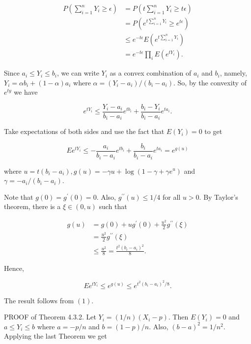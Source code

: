 \documentclass[13pt]{article}
\theoremstyle{definition}
\theoremstyle{remark}
\begin{document}
$$
\begin{aligned}
P\left(\sum_{i=1}^{n} Y_{i} \geq \epsilon\right) & =P\left(t \sum_{i=1}^{n} Y_{i} \geq t \epsilon\right) \\
& =P\left(e^{t \sum_{i=1}^{n} Y_{i}} \geq e^{t \epsilon}\right) \\
& \leq e^{-t \epsilon} E\left(e^{t \sum_{i=1}^{n} Y_{i}}\right) \\
& =e^{-t \epsilon} \prod_{i} E\left(e^{t Y_{i}}\right) .
\end{aligned}
$$

Since $a_{i} \leq Y_{i} \leq b_{i}$, we can write $Y_{i}$ as a convex combination of $a_{i}$ and $b_{i}$, namely, $Y_{i}=\alpha b_{i}+(1-\alpha) a_{i}$ where $\alpha=\left(Y_{i}-a_{i}\right) /\left(b_{i}-a_{i}\right)$. So, by the convexity of $e^{t y}$ we have

$$
e^{t Y_{i}} \leq \frac{Y_{i}-a_{i}}{b_{i}-a_{i}} e^{t b_{i}}+\frac{b_{i}-Y_{i}}{b_{i}-a_{i}} e^{t a_{i}} .
$$

Take expectations of both sides and use the fact that $E\left(Y_{i}\right)=0$ to get

$$
E e^{t Y_{i}} \leq-\frac{a_{i}}{b_{i}-a_{i}} e^{t b_{i}}+\frac{b_{i}}{b_{i}-a_{i}} e^{t a_{i}}=e^{g(u)}
$$

where $u=t\left(b_{i}-a_{i}\right), g(u)=-\gamma u+\log \left(1-\gamma+\gamma e^{u}\right)$ and $\gamma=-a_{i} /\left(b_{i}-a_{i}\right)$.

Note that $g(0)=g^{\prime}(0)=0$. Also, $g^{\prime \prime}(u) \leq 1 / 4$ for all $u>0$. By Taylor's theorem, there is a $\xi \in(0, u)$ such that

$$
\begin{aligned}
g(u) & =g(0)+u g^{\prime}(0)+\frac{u^{2}}{2} g^{\prime \prime}(\xi) \\
& =\frac{u^{2}}{2} g^{\prime \prime}(\xi) \\
& \leq \frac{u^{2}}{8}=\frac{t^{2}\left(b_{i}-a_{i}\right)^{2}}{8} .
\end{aligned}
$$

Hence,

$$
E e^{t Y_{i}} \leq e^{g(u)} \leq e^{t^{2}\left(b_{i}-a_{i}\right)^{2} / 8} .
$$

The result follows from $(1)$.

PROOF of Theorem 4.3.2. Let $Y_{i}=(1 / n)\left(X_{i}-p\right)$. Then $E\left(Y_{i}\right)=0$ and $a \leq Y_{i} \leq b$ where $a=-p / n$ and $b=(1-p) / n$. Also, $(b-a)^{2}=1 / n^{2}$. Applying the last Theorem we get
\end{document}
